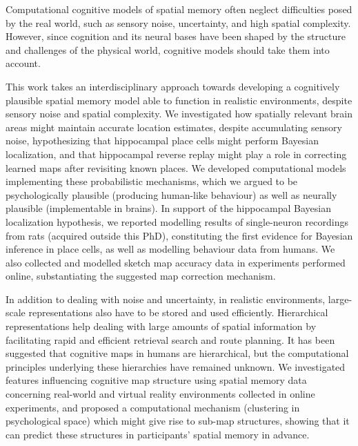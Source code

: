 %
{
\singlespacing
{}
Computational cognitive models of spatial memory often neglect difficulties posed by the real world, such as sensory noise, uncertainty, and high spatial complexity. However, since cognition and its neural bases have been shaped by the structure and challenges of the physical world, cognitive models should take them into account.

This work takes an interdisciplinary approach towards developing a cognitively plausible spatial memory model able to function in realistic environments, despite sensory noise and spatial complexity. We investigated how spatially relevant brain areas might maintain accurate location estimates, despite accumulating sensory noise, hypothesizing that hippocampal place cells might perform Bayesian localization, and that hippocampal reverse replay might play a role in correcting learned maps after revisiting known places. We developed computational models implementing these probabilistic mechanisms, which we argued to be psychologically plausible (producing human-like behaviour) as well as neurally plausible (implementable in brains). In support of the hippocampal Bayesian localization hypothesis, we reported modelling results of single-neuron recordings from rats (acquired outside this PhD), constituting the first evidence for Bayesian inference in place cells, as well as modelling behaviour data from humans. We also collected and modelled sketch map accuracy data in experiments performed online, substantiating the suggested map correction mechanism.

In addition to dealing with noise and uncertainty, in realistic environments, large-scale representations also have to be stored and used efficiently. Hierarchical representations help dealing with large amounts of spatial information by facilitating rapid and efficient retrieval search and route planning. It has been suggested that cognitive maps in humans are hierarchical, but the computational principles underlying these hierarchies have remained unknown. We investigated features influencing cognitive map structure using spatial memory data concerning real-world and virtual reality environments collected in online experiments, and proposed a computational mechanism (clustering in psychological space) which might give rise to sub-map structures, showing that it can predict these structures in participants' spatial memory in advance.

}
